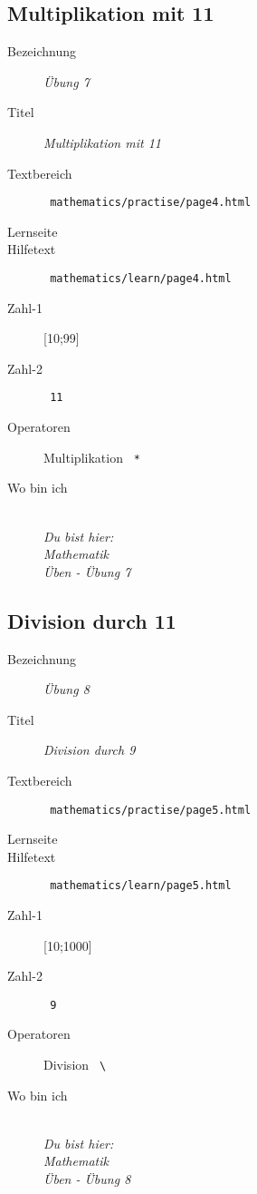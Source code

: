 \subsection{ Multiplikation mit 11 }
\label{cha:math-practise-page8}
\begin{description}
  \item[Bezeichnung] \emph{ Übung 7 }
  \item[Titel] \emph{ Multiplikation mit 11 }
  \item[Textbereich] \texttt{ mathematics/practise/page4.html }
  \item[Lernseite] 
  \item[Hilfetext] \texttt{ mathematics/learn/page4.html }
  \item[Zahl-1] [10;99]
  \item[Zahl-2] \texttt{ 11 }
  \item[Operatoren] Multiplikation \texttt{ * }
  \item[Wo bin ich] \emph{\\Du bist hier:\\Mathematik\\Üben - Übung 7}
\end{description}




\subsection{ Division durch 11 }
\label{cha:math-practise-page9}
\begin{description}
  \item[Bezeichnung] \emph{ Übung 8 }
  \item[Titel] \emph{ Division durch 9 }
  \item[Textbereich] \texttt{ mathematics/practise/page5.html }
  \item[Lernseite] 
  \item[Hilfetext] \texttt{ mathematics/learn/page5.html }
  \item[Zahl-1] [10;1000]
  \item[Zahl-2] \texttt{ 9 }
  \item[Operatoren] Division \texttt{ \textbackslash }
  \item[Wo bin ich] \emph{\\Du bist hier:\\Mathematik\\Üben - Übung 8}
\end{description}
